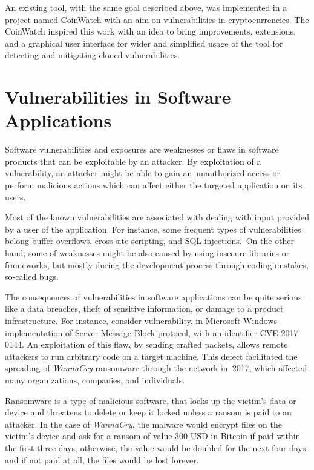  An existing tool, with the same goal described above, was implemented in a project named CoinWatch
  \cite{CoinWatch} with an aim on vulnerabilities in cryptocurrencies. The CoinWatch inspired this work
  with an idea to bring improvements, extensions, and a graphical user interface for wider and simplified
  usage of the tool for detecting and mitigating cloned vulnerabilities.


\chapter{Vulnerabilities in Software Applications}
  Software vulnerabilities and exposures are weaknesses or flaws in software products that can be
  exploitable by an attacker. By exploitation of a vulnerability, an attacker might be able to gain
  an~unauthorized access or perform malicious actions which can affect either the targeted application
  or~its users.

  Most of the known vulnerabilities are associated with dealing with input provided by a user
  of the application. For instance, some frequent types of vulnerabilities belong buffer overflows,
  cross site scripting, and SQL injections.\,\cite{vulnerabilities} On the other hand, some of weaknesses
  might be also caused by using insecure libraries or frameworks, but mostly during the development process
  through coding mistakes, so-called bugs.

  The consequences of vulnerabilities in software applications can be quite serious like a data breaches,
  theft of sensitive information, or damage to a product infrastructure. For instance, consider
  vulnerability, in Microsoft Windows implementation of Server Message Block protocol, with an identifier
  CVE-2017-0144. An exploitation of this flaw, by sending crafted packets, allows remote attackers to run
  arbitrary code on a target machine. This defect facilitated the spreading of \emph{WannaCry} ransomware
  through the network in~2017, which affected many organizations, companies, and individuals.

  Ransomware is a type of malicious software, that locks up the victim's data or device and threatens to delete
  or keep it locked unless a ransom is paid to an attacker. In the case of \emph{WannaCry}, the malware
  would encrypt files on the victim's device and ask for a ransom of value 300 USD in Bitcoin if paid within
  the first three days, otherwise, the value would be doubled for the next four days and if not paid at all,
  the files would be lost forever.

